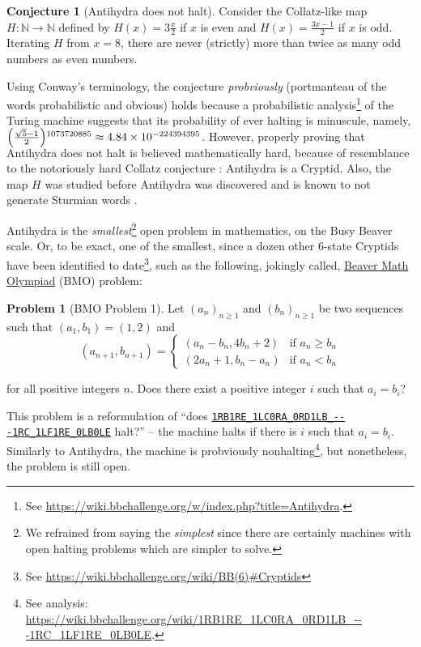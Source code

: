 \documentclass[letterpaper,british,11pt]{article}
\theoremstyle{definition} %
\newtheorem{conjecture}{Conjecture}[section]
\newtheorem{problem}{Problem}[section]
\numberwithin{equation}{section}
\theoremstyle{definition} %
\newcommand{\tm}[1]{\href{https://bbchallenge.org/#1}{\texttt{\nolinkurl{#1}}}}
\begin{document}
\begin{conjecture}[Antihydra does not halt]
    Consider the Collatz-like map $H: \mathbb{N} \to \mathbb{N}$ defined by $H(x) = 3\frac{x}{2}$ if $x$ is even and $H(x) = \frac{3x-1}{2}$ if $x$ is odd. Iterating $H$ from $x=8$, there are never (strictly) more than twice as many odd numbers as even numbers.
\end{conjecture}

Using Conway's terminology, the conjecture \textit{probviously} (portmanteau of the words probabilistic and obvious) holds because a probabilistic analysis\footnote{See \url{https://wiki.bbchallenge.org/w/index.php?title=Antihydra}.} of the Turing machine suggests that its probability of ever halting is minuscule, namely, $\smash{\left(\frac{\sqrt{5}-1}{2}\right)}^{1073720885}\approx 4.84\times 10^{-224394395}$. However, properly proving that Antihydra does not halt is believed mathematically hard, because of resemblance to the notoriously hard Collatz conjecture \cite{LagariasCollatz}: Antihydra is a Cryptid. Also, the map $H$ was studied before Antihydra was discovered and is known to not generate Sturmian words \cite{DUBICKAS_2009}.

Antihydra is the \textit{smallest}\footnote{We refrained from saying the \textit{simplest} since there are certainly machines with open halting problems which are simpler to solve.} open problem in mathematics, on the Busy Beaver scale. Or, to be exact, one of the smallest, since a dozen other 6-state Cryptids have been identified to date\footnote{See \url{https://wiki.bbchallenge.org/wiki/BB(6)\#Cryptids}}, such as the following, jokingly called, \href{https://wiki.bbchallenge.org/wiki/Beaver_Math_Olympiad}{Beaver Math Olympiad} (BMO) problem:

\begin{problem}[BMO Problem 1]
Let $(a_n)_{n \ge 1}$ and $(b_n)_{n \ge 1}$ be two sequences such that $(a_1, b_1) = (1, 2)$ and
$$(a_{n+1}, b_{n+1}) = \begin{cases}
        (a_n-b_n, 4b_n+2) & \text{if }a_n \ge b_n \\
        (2a_n+1, b_n-a_n) & \text{if }a_n < b_n
    \end{cases}$$

\noindent for all positive integers $n$. Does there exist a positive integer $i$ such that $a_i = b_i$?
\end{problem}

This problem is a reformulation of  ``does \tm{1RB1RE_1LC0RA_0RD1LB_---1RC_1LF1RE_0LB0LE} halt?'' -- the machine halts if there is $i$ such that $a_i = b_i$. Similarly to Antihydra, the machine is probviously nonhalting\footnote{See analysis: {\scriptsize \url{https://wiki.bbchallenge.org/wiki/1RB1RE_1LC0RA_0RD1LB_---1RC_1LF1RE_0LB0LE}}. }, but nonetheless, the problem is still open.
\end{document}
